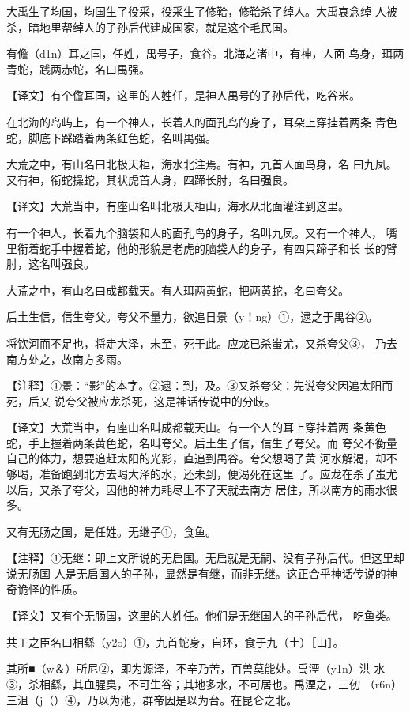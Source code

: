 \documentclass[a4paper,12pt,UTF8,twoside]{ctexbook}
\begin{document}
大禹生了均国，均国生了役采，役采生了修鞈，修鞈杀了绰人。大禹哀念绰 人被杀，暗地里帮绰人的子孙后代建成国家，就是这个毛民国。

有儋（d1n）耳之国，任姓，禺号子，食谷。北海之渚中，有神，人面 鸟身，珥两青蛇，践两赤蛇，名曰禺强。

【译文】有个儋耳国，这里的人姓任，是神人禺号的子孙后代，吃谷米。

在北海的岛屿上，有一个神人，长着人的面孔鸟的身子，耳朵上穿挂着两条 青色蛇，脚底下踩踏着两条红色蛇，名叫禺强。

大荒之中，有山名曰北极天柜，海水北注焉。有神，九首人面鸟身，名 曰九凤。又有神，衔蛇操蛇，其状虎首人身，四蹄长肘，名曰强良。

【译文】大荒当中，有座山名叫北极天柜山，海水从北面灌注到这里。

有一个神人，长着九个脑袋和人的面孔鸟的身子，名叫九凤。又有一个神人， 嘴里衔着蛇手中握着蛇，他的形貌是老虎的脑袋人的身子，有四只蹄子和长 长的臂肘，这名叫强良。

大荒之中，有山名曰成都载天。有人珥两黄蛇，把两黄蛇，名曰夸父。

后土生信，信生夸父。夸父不量力，欲追日景（y！ng）①，逮之于禺谷②。

将饮河而不足也，将走大泽，未至，死于此。应龙已杀蚩尤，又杀夸父③， 乃去南方处之，故南方多雨。

【注释】①景：“影”的本字。②逮：到，及。③又杀夸父：先说夸父因追太阳而死，后又 说夸父被应龙杀死，这是神话传说中的分歧。

【译文】大荒当中，有座山名叫成都载天山。有一个人的耳上穿挂着两 条黄色蛇，手上握着两条黄色蛇，名叫夸父。后土生了信，信生了夸父。而 夸父不衡量自己的体力，想要追赶太阳的光影，直追到禺谷。夸父想喝了黄 河水解渴，却不够喝，准备跑到北方去喝大泽的水，还未到，便渴死在这里 了。应龙在杀了蚩尤以后，又杀了夸父，因他的神力耗尽上不了天就去南方 居住，所以南方的雨水很多。

又有无肠之国，是任姓。无继子①，食鱼。

【注释】①无继：即上文所说的无启国。无启就是无嗣、没有子孙后代。但这里却说无肠国 人是无启国人的子孙，显然是有继，而非无继。这正合乎神话传说的神奇诡怪的性质。

【译文】又有个无肠国，这里的人姓任。他们是无继国人的子孙后代， 吃鱼类。

共工之臣名曰相繇（y2o）①，九首蛇身，自环，食于九（土）［山］。

其所■（w＆）所尼②，即为源泽，不辛乃苦，百兽莫能处。禹湮（y1n）洪 水③，杀相繇，其血腥臭，不可生谷；其地多水，不可居也。禹湮之，三仞 （r6n）三沮（j（）④，乃以为池，群帝因是以为台。在昆仑之北。
\end{document}
